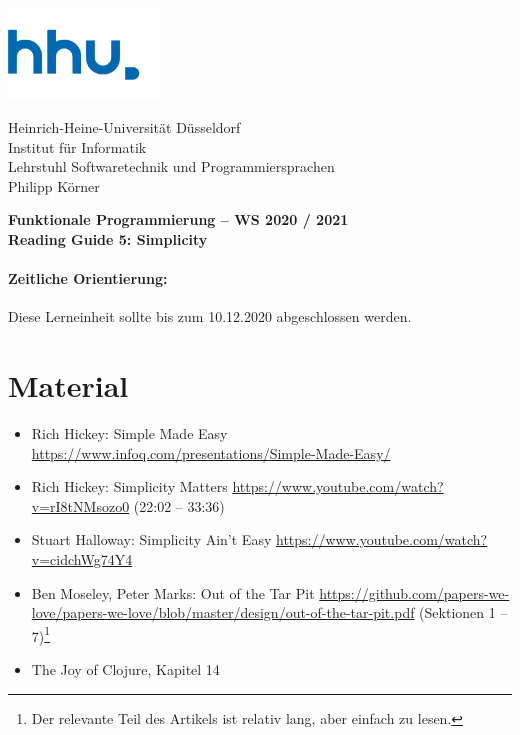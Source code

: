 \documentclass[11pt,a4paper]{article}
\theoremstyle{break}
\begin{document}
\begin{minipage}[b]{\textwidth}
\parbox[t]{5cm}{%
\includegraphics[width=4cm]{unilogo}
\hfill
}
\parbox[b]{11cm}{%
Heinrich-Heine-Universit\"at D\"usseldorf\\
Institut f\"ur Informatik\\
Lehrstuhl Softwaretechnik und Programmiersprachen\\
Philipp K\"orner
}

\end{minipage}
\begin{center}
\bf
Funktionale Programmierung -- WS 2020 / 2021\\
Reading Guide 5: Simplicity
\end{center}

\pagestyle{empty}

\paragraph{Zeitliche Orientierung:} Diese Lerneinheit sollte bis zum 10.12.2020 abgeschlossen werden.

\section{Material} 

\begin{itemize}
\item Rich Hickey: Simple Made Easy \url{https://www.infoq.com/presentations/Simple-Made-Easy/}
\item Rich Hickey: Simplicity Matters \url{https://www.youtube.com/watch?v=rI8tNMsozo0} (22:02 -- 33:36)
\item Stuart Halloway: Simplicity Ain't Easy \url{https://www.youtube.com/watch?v=cidchWg74Y4}
\item Ben Moseley, Peter Marks: Out of the Tar Pit \url{https://github.com/papers-we-love/papers-we-love/blob/master/design/out-of-the-tar-pit.pdf} (Sektionen 1 -- 7)\footnote{Der relevante Teil des Artikels ist relativ lang, aber einfach zu lesen.}
\item The Joy of Clojure, Kapitel 14
\end{itemize}
\end{document}
